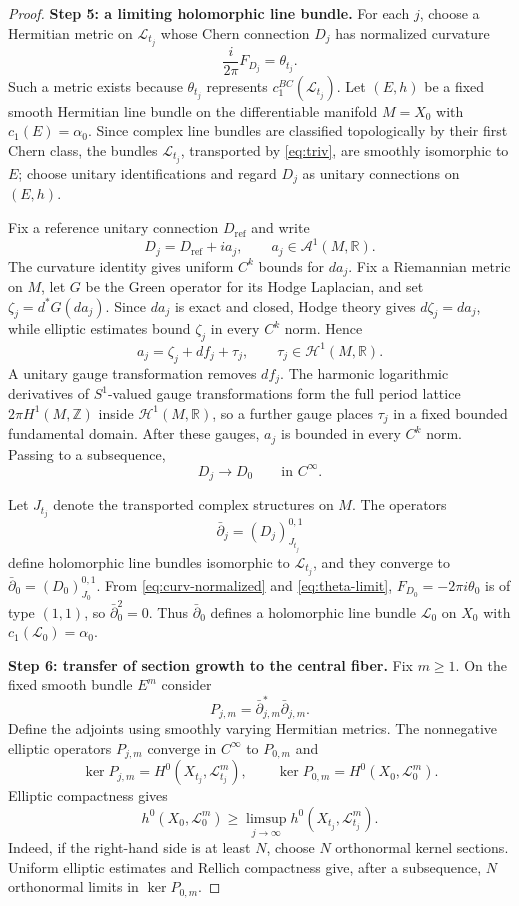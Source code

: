 \documentclass[11pt,letterpaper]{amsart}
\numberwithin{equation}{section}
\newcommand{\RR}{\mathbb{R}}
\newcommand{\ZZ}{\mathbb{Z}}
\newcommand{\cal}{\mathcal}
\def\cL{{\cal L}}
\begin{document}
\begin{proof}
\smallskip
\noindent\textbf{Step 5: a limiting holomorphic line bundle.}
For each $j$, choose a Hermitian metric on $\cL_{t_j}$ whose Chern connection
$D_j$ has normalized curvature
\begin{equation}\label{eq:curv-normalized}
 \frac{i}{2\pi}F_{D_j}=\theta_{t_j}.
\end{equation}
Such a metric exists because $\theta_{t_j}$ represents $c_1^{BC}(\cL_{t_j})$. Let $(E,h)$ be a fixed smooth Hermitian line bundle on
the differentiable manifold $M=X_0$ with $c_1(E)=\alpha_0$. Since complex
line bundles are classified topologically by their first Chern class, the
bundles $\cL_{t_j}$, transported by \eqref{eq:triv}, are smoothly isomorphic
to $E$; choose unitary identifications and regard $D_j$ as unitary connections
on $(E,h)$.

Fix a reference unitary connection $D_{\mathrm{ref}}$ and write
\[
 D_j=D_{\mathrm{ref}}+ia_j,\qquad a_j\in\mathcal A^1(M,\RR).
\]
The curvature identity gives uniform $C^k$ bounds for $da_j$. Fix a
Riemannian metric on $M$, let $G$ be the Green operator for its Hodge
Laplacian, and set $\zeta_j=d^*G(da_j)$. Since $da_j$ is exact and closed,
Hodge theory gives $d\zeta_j=da_j$, while elliptic estimates bound
$\zeta_j$ in every $C^k$ norm. Hence
\[
 a_j=\zeta_j+df_j+\tau_j,
 \qquad \tau_j\in\mathcal H^1(M,\RR).
\]
A unitary gauge transformation removes $df_j$. The harmonic logarithmic
derivatives of $S^1$-valued gauge transformations form the full period lattice
$2\pi H^1(M,\ZZ)$ inside $\mathcal H^1(M,\RR)$, so a further gauge places
$\tau_j$ in a fixed bounded fundamental domain. After these gauges, $a_j$ is
bounded in every $C^k$ norm. Passing to a subsequence,
\begin{equation}\label{eq:Dlimit}
 D_j\to D_0\qquad\text{in }C^\infty.
\end{equation}

Let $J_{t_j}$ denote the transported complex structures on $M$. The operators
\[
 \bar\partial_j=(D_j)^{0,1}_{J_{t_j}}
\]
define holomorphic line bundles isomorphic to $\cL_{t_j}$, and they converge
to $\bar\partial_0=(D_0)^{0,1}_{J_0}$. From
\eqref{eq:curv-normalized} and \eqref{eq:theta-limit},
$F_{D_0}=-2\pi i\theta_0$ is of type $(1,1)$, so
$\bar\partial_0^2=0$. Thus $\bar\partial_0$ defines a holomorphic line bundle
$\cL_0$ on $X_0$ with $c_1(\cL_0)=\alpha_0$.

\smallskip
\noindent\textbf{Step 6: transfer of section growth to the central fiber.}
Fix $m\ge1$. On the fixed smooth bundle $E^m$ consider
\[
 P_{j,m}=\bar\partial_{j,m}^*\bar\partial_{j,m}.
\]
Define the adjoints using smoothly varying Hermitian metrics.
The nonnegative elliptic operators $P_{j,m}$ converge in $C^\infty$ to
$P_{0,m}$ and
\[
 \ker P_{j,m}=H^0(X_{t_j},\cL_{t_j}^m),\qquad
 \ker P_{0,m}=H^0(X_0,\cL_0^m).
\]
Elliptic compactness gives
\begin{equation}\label{eq:kernel-semicont}
 h^0(X_0,\cL_0^m)
 \ge\limsup_{j\to\infty}h^0(X_{t_j},\cL_{t_j}^m).
\end{equation}
Indeed, if the right-hand side is at least $N$, choose $N$ orthonormal kernel sections. Uniform elliptic estimates and Rellich compactness give, after a
subsequence, $N$ orthonormal limits in $\ker P_{0,m}$.


\end{proof}
\end{document}
